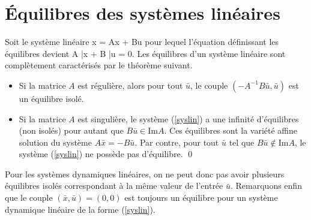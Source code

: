 \section{\'Equilibres des syst\`emes lin\'eaires} 

Soit le syst\`eme lin\'eaire 
\eqnn
\dot x = Ax + Bu \label{syslin}
\eeqnn
pour lequel l'\'equation d\'efinissant
les \'equilibres devient
\eqnn A \bar x + B \bar u = 0. \eeqnn
Les \'equilibres d'un syst\`eme lin\'eaire sont compl\`etement
caract\'eris\'es par le th\'eor\`eme suivant.

\begin{theoreme}{\blanc}
\begin{itemize}
\item  Si la matrice $A$ est r\'eguli\`ere, alors pour tout $\bar u$, le couple
$(-A^{-1}B\bar u,\bar u)$ est un \'equilibre isol\'e.
\item Si la matrice $A$ est singuli\`ere, le syst\`eme
(\ref{syslin}) a une infinit\'e d'\'equilibres (non isol\'es) pour
autant que $B\bar u \in \mbox{Im}A$. Ces \'equilibres sont la
vari\'et\'e affine solution du syst\`eme $A \bar x = -B \bar u$. Par
contre, pour tout $\bar u$ tel que $B\bar u \notin \mbox{Im}A$, le
syst\`eme (\ref{syslin}) ne poss\`ede pas d'\'equilibre. \qed
\end{itemize}
\end{theoreme}

Pour les syst\`emes dynamiques lin\'eaires, on ne peut donc pas avoir
plusieurs
\'equilibres isol\'es correspondant \`a la m\^eme valeur de l'entr\'ee
$\bar u$.  Remarquons enfin que le couple $(\bar x, \bar u) = (0,0)$ est toujours un
\'equilibre pour un syst\`eme dynamique lin\'eaire de la forme (\ref{syslin}).

